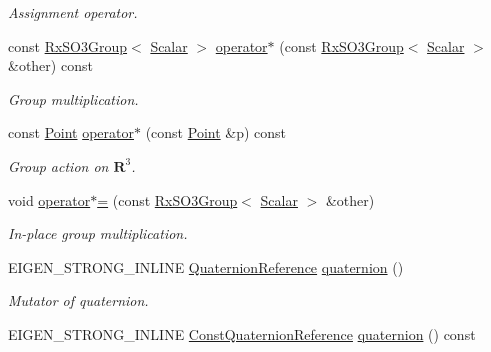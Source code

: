 \begin{DoxyCompactItemize}
\begin{DoxyCompactList}\small\item\em Assignment operator. \end{DoxyCompactList}\item 
const \hyperlink{class_sophus_1_1_rx_s_o3_group}{Rx\+S\+O3\+Group}$<$ \hyperlink{class_sophus_1_1_rx_s_o3_group_base_af4006e7d95216a7e50823a1cd9c9e265}{Scalar} $>$ \hyperlink{class_sophus_1_1_rx_s_o3_group_base_a26b9ea82336b1857f4a9cd9c66b51b1e}{operator$\ast$} (const \hyperlink{class_sophus_1_1_rx_s_o3_group}{Rx\+S\+O3\+Group}$<$ \hyperlink{class_sophus_1_1_rx_s_o3_group_base_af4006e7d95216a7e50823a1cd9c9e265}{Scalar} $>$ \&other) const 
\begin{DoxyCompactList}\small\item\em Group multiplication. \end{DoxyCompactList}\item 
const \hyperlink{class_sophus_1_1_rx_s_o3_group_base_ad2d1b35ab03f6e91a80c2e78f07114a0}{Point} \hyperlink{class_sophus_1_1_rx_s_o3_group_base_a464df8f39a1f89f865ce7bb02e1154ec}{operator$\ast$} (const \hyperlink{class_sophus_1_1_rx_s_o3_group_base_ad2d1b35ab03f6e91a80c2e78f07114a0}{Point} \&p) const 
\begin{DoxyCompactList}\small\item\em Group action on $ \mathbf{R}^3 $. \end{DoxyCompactList}\item 
void \hyperlink{class_sophus_1_1_rx_s_o3_group_base_a91b5b4541313ce867db3b96dadf1cdb1}{operator$\ast$=} (const \hyperlink{class_sophus_1_1_rx_s_o3_group}{Rx\+S\+O3\+Group}$<$ \hyperlink{class_sophus_1_1_rx_s_o3_group_base_af4006e7d95216a7e50823a1cd9c9e265}{Scalar} $>$ \&other)
\begin{DoxyCompactList}\small\item\em In-\/place group multiplication. \end{DoxyCompactList}\item 
E\+I\+G\+E\+N\+\_\+\+S\+T\+R\+O\+N\+G\+\_\+\+I\+N\+L\+I\+NE \hyperlink{class_sophus_1_1_rx_s_o3_group_base_a3575bb8e7108073f73835ed59623d94a}{Quaternion\+Reference} \hyperlink{class_sophus_1_1_rx_s_o3_group_base_aec68e74ddebe953b41fc7ec597fde9ed}{quaternion} ()\hypertarget{class_sophus_1_1_rx_s_o3_group_base_aec68e74ddebe953b41fc7ec597fde9ed}{}\label{class_sophus_1_1_rx_s_o3_group_base_aec68e74ddebe953b41fc7ec597fde9ed}

\begin{DoxyCompactList}\small\item\em Mutator of quaternion. \end{DoxyCompactList}\item 
E\+I\+G\+E\+N\+\_\+\+S\+T\+R\+O\+N\+G\+\_\+\+I\+N\+L\+I\+NE \hyperlink{class_sophus_1_1_rx_s_o3_group_base_a3f2849c5a1cea4f295be3f149a4eee6d}{Const\+Quaternion\+Reference} \hyperlink{class_sophus_1_1_rx_s_o3_group_base_a1bd73e5ff76441f3f5321f8fa0d95f4d}{quaternion} () const \hypertarget{class_sophus_1_1_rx_s_o3_group_base_a1bd73e5ff76441f3f5321f8fa0d95f4d}{}\label{class_sophus_1_1_rx_s_o3_group_base_a1bd73e5ff76441f3f5321f8fa0d95f4d}


\end{DoxyCompactItemize}
